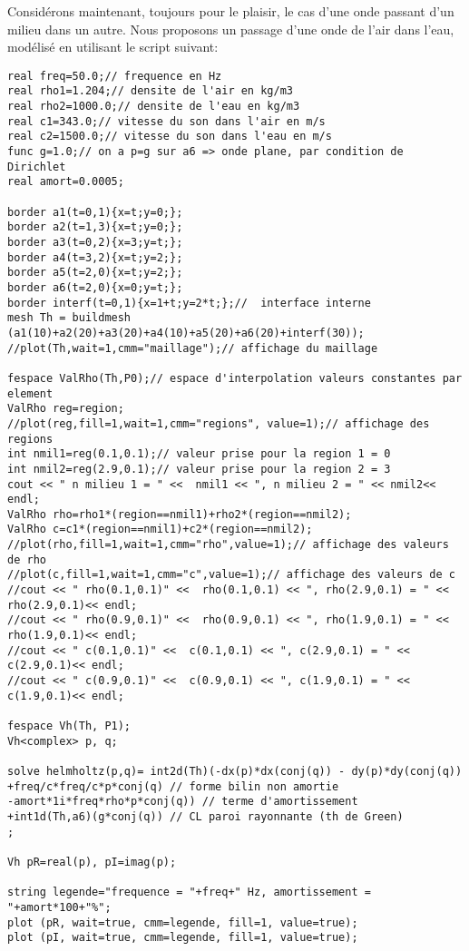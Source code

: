 Considérons maintenant, toujours pour le plaisir, le cas d'une onde passant d'un milieu dans un autre. Nous proposons un passage d'une onde de l'air dans l'eau, modélisé en utilisant le script \freefem suivant:
\begin{lstlisting}[firstnumber=1]
real freq=50.0;// frequence en Hz
real rho1=1.204;// densite de l'air en kg/m3
real rho2=1000.0;// densite de l'eau en kg/m3
real c1=343.0;// vitesse du son dans l'air en m/s
real c2=1500.0;// vitesse du son dans l'eau en m/s
func g=1.0;// on a p=g sur a6 => onde plane, par condition de Dirichlet
real amort=0.0005;

border a1(t=0,1){x=t;y=0;};
border a2(t=1,3){x=t;y=0;};
border a3(t=0,2){x=3;y=t;};
border a4(t=3,2){x=t;y=2;};
border a5(t=2,0){x=t;y=2;};
border a6(t=2,0){x=0;y=t;};
border interf(t=0,1){x=1+t;y=2*t;};//  interface interne
mesh Th = buildmesh (a1(10)+a2(20)+a3(20)+a4(10)+a5(20)+a6(20)+interf(30));
//plot(Th,wait=1,cmm="maillage");// affichage du maillage

fespace ValRho(Th,P0);// espace d'interpolation valeurs constantes par element
ValRho reg=region;
//plot(reg,fill=1,wait=1,cmm="regions", value=1);// affichage des regions
int nmil1=reg(0.1,0.1);// valeur prise pour la region 1 = 0
int nmil2=reg(2.9,0.1);// valeur prise pour la region 2 = 3
cout << " n milieu 1 = " <<  nmil1 << ", n milieu 2 = " << nmil2<< endl;
ValRho rho=rho1*(region==nmil1)+rho2*(region==nmil2);
ValRho c=c1*(region==nmil1)+c2*(region==nmil2);
//plot(rho,fill=1,wait=1,cmm="rho",value=1);// affichage des valeurs de rho
//plot(c,fill=1,wait=1,cmm="c",value=1);// affichage des valeurs de c
//cout << " rho(0.1,0.1)" <<  rho(0.1,0.1) << ", rho(2.9,0.1) = " << rho(2.9,0.1)<< endl;
//cout << " rho(0.9,0.1)" <<  rho(0.9,0.1) << ", rho(1.9,0.1) = " << rho(1.9,0.1)<< endl;
//cout << " c(0.1,0.1)" <<  c(0.1,0.1) << ", c(2.9,0.1) = " << c(2.9,0.1)<< endl;
//cout << " c(0.9,0.1)" <<  c(0.9,0.1) << ", c(1.9,0.1) = " << c(1.9,0.1)<< endl;

fespace Vh(Th, P1);
Vh<complex> p, q;

solve helmholtz(p,q)= int2d(Th)(-dx(p)*dx(conj(q)) - dy(p)*dy(conj(q)) +freq/c*freq/c*p*conj(q) // forme bilin non amortie
-amort*1i*freq*rho*p*conj(q)) // terme d'amortissement
+int1d(Th,a6)(g*conj(q)) // CL paroi rayonnante (th de Green)
;

Vh pR=real(p), pI=imag(p);

string legende="frequence = "+freq+" Hz, amortissement = "+amort*100+"%";
plot (pR, wait=true, cmm=legende, fill=1, value=true);
plot (pI, wait=true, cmm=legende, fill=1, value=true);
\end{lstlisting}
